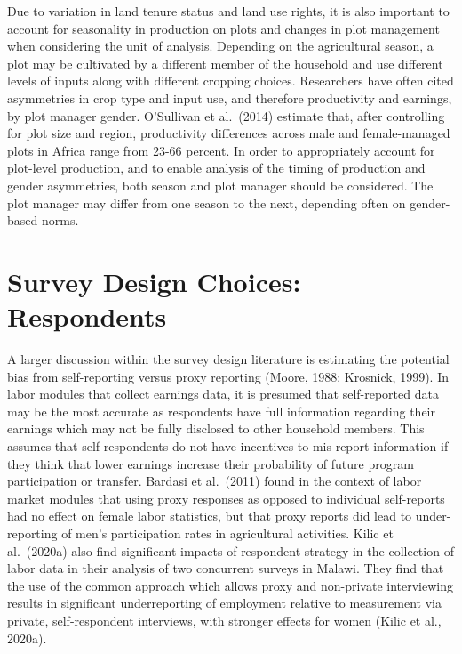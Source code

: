 \documentclass[
]{book}
\begin{document}
Due to variation in land tenure status and land use rights, it is also important to account for seasonality in production on plots and changes in plot management when considering the unit of analysis. Depending on the agricultural season, a plot may be cultivated by a different member of the household and use different levels of inputs along with different cropping choices. Researchers have often cited asymmetries in crop type and input use, and therefore productivity and earnings, by plot manager gender. O'Sullivan et al.~(2014) estimate that, after controlling for plot size and region, productivity differences across male and female-managed plots in Africa range from 23-66 percent. In order to appropriately account for plot-level production, and to enable analysis of the timing of production and gender asymmetries, both season and plot manager should be considered. The plot manager may differ from one season to the next, depending often on gender-based norms.

\hypertarget{survey-design-choices-respondents}{%
\section{Survey Design Choices: Respondents}\label{survey-design-choices-respondents}}

A larger discussion within the survey design literature is estimating the potential bias from self-reporting versus proxy reporting (Moore, 1988; Krosnick, 1999). In labor modules that collect earnings data, it is presumed that self-reported data may be the most accurate as respondents have full information regarding their earnings which may not be fully disclosed to other household members. This assumes that self-respondents do not have incentives to mis-report information if they think that lower earnings increase their probability of future program participation or transfer. Bardasi et al.~(2011) found in the context of labor market modules that using proxy responses as opposed to individual self-reports had no effect on female labor statistics, but that proxy reports did lead to under-reporting of men's participation rates in agricultural activities. Kilic et al.~(2020a) also find significant impacts of respondent strategy in the collection of labor data in their analysis of two concurrent surveys in Malawi. They find that the use of the common approach which allows proxy and non-private interviewing results in significant underreporting of employment relative to measurement via private, self-respondent interviews, with stronger effects for women (Kilic et al., 2020a).
\end{document}
